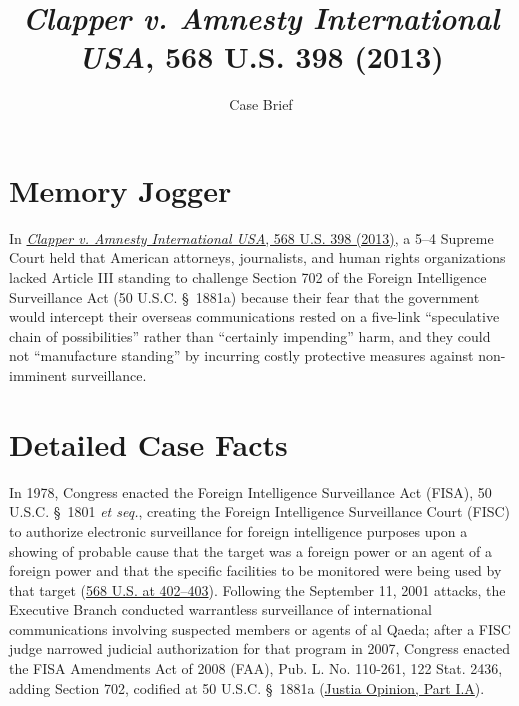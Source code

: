 \documentclass[12pt]{article}
\title{\textit{Clapper v. Amnesty International USA}, 568 U.S. 398 (2013)}
\author{Case Brief}
\date{}
\begin{document}
\maketitle

\section{Memory Jogger}

In \href{https://supreme.justia.com/cases/federal/us/568/398/}{\textit{Clapper v. Amnesty International USA}, 568 U.S. 398 (2013)}, a 5--4 Supreme Court held that American attorneys, journalists, and human rights organizations lacked Article III standing to challenge Section 702 of the Foreign Intelligence Surveillance Act (50 U.S.C. \S~1881a) because their fear that the government would intercept their overseas communications rested on a five-link ``speculative chain of possibilities'' rather than ``certainly impending'' harm, and they could not ``manufacture standing'' by incurring costly protective measures against non-imminent surveillance.

\section{Detailed Case Facts}

In 1978, Congress enacted the Foreign Intelligence Surveillance Act (FISA), 50 U.S.C. \S~1801 \textit{et seq.}, creating the Foreign Intelligence Surveillance Court (FISC) to authorize electronic surveillance for foreign intelligence purposes upon a showing of probable cause that the target was a foreign power or an agent of a foreign power and that the specific facilities to be monitored were being used by that target (\href{https://tile.loc.gov/storage-services/service/ll/usrep/usrep568/usrep568398/usrep568398.pdf}{568 U.S. at 402--403}). Following the September 11, 2001 attacks, the Executive Branch conducted warrantless surveillance of international communications involving suspected members or agents of al Qaeda; after a FISC judge narrowed judicial authorization for that program in 2007, Congress enacted the FISA Amendments Act of 2008 (FAA), Pub. L. No. 110-261, 122 Stat. 2436, adding Section 702, codified at 50 U.S.C. \S~1881a (\href{https://supreme.justia.com/cases/federal/us/568/398/}{Justia Opinion, Part I.A}).
\end{document}
